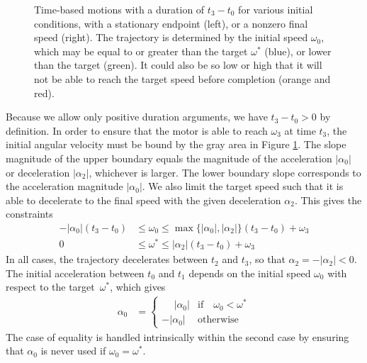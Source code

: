 \documentclass[12pt, a4paper]
{article}
\providecommand{\lr}[1]{\left(#1\right)}
\providecommand{\w}{\omega}
\providecommand{\wt}{\w^*}
\renewcommand{\a}{\alpha}
\providecommand{\abs}[1]{\left|#1\right|}
\begin{document}
\begin{figure}[H]
    \centering
    
    \caption{
        Time-based motions with a duration of $t_3-t_0$ for various initial
        conditions, with a stationary endpoint (left), or a nonzero final speed
        (right). The trajectory is determined by the initial speed $\w_0$,
        which may be equal to or greater than the target $\wt$ (blue),
        or lower than the target (green). It could also be so low or high that
        it will not be able to reach the target speed before completion
        (orange and red).\label{fig:time}}
\end{figure}

Because we allow only positive duration arguments, we have $t_3-t_0 > 0$ by
definition. In order to ensure that the motor is able to reach $\w_3$ at time
$t_3$, the initial angular velocity must be bound by the gray area in Figure
\ref{fig:time}. The slope magnitude of the upper boundary equals the magnitude
of the acceleration $\abs{\a_0}$ or deceleration $\abs{\a_2}$, whichever is
larger. The lower boundary slope corresponds to the acceleration magnitude
$\abs{\a_0}$. We also limit the target speed such that it is able to
decelerate to the final speed with the given deceleration $\a_2$. This gives
the constraints
%
\begin{align}
    -\abs{\a_0} \lr{t_3-t_0} &\leq \w_0 \leq \max \{\abs{\a_0}, \abs{\a_2}\} \lr{t_3-t_0} + \w_3\label{eq:t:timeboundary1}\\[1em]
    0 &\leq \wt \leq \abs{\a_2} \lr{t_3-t_0} + \w_3\nonumber
\end{align}
%
In all cases, the trajectory decelerates between $t_2$ and $t_3$, so that
$\a_2  = - \abs{\a_2} < 0$. The initial acceleration between $t_0$ and $t_1$
depends on the initial speed $\w_0$ with respect to the \mbox{target $\wt$},
which gives
%
\begin{align}
    \label{eq:t:accel0}
    \a_0 &= 
        \begin{cases}
        \phantom{-}\abs{\a_0} & \text{if} \quad \w_0 < \wt\\ 
        -\abs{\a_0} &  \text{otherwise}
        \end{cases}
\end{align}
%
The case of equality is handled intrinsically within the
second case by ensuring that $\a_0$ is never used if $\w_0 = \wt$.
\end{document}
